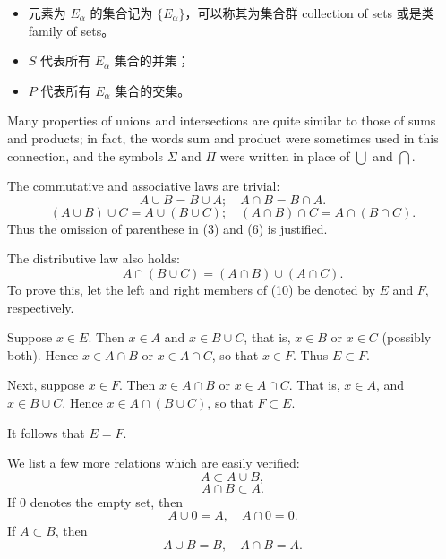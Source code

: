 \documentclass[../poma-notes.tex]{subfiles}
\begin{document}
\begin{anote}
  \begin{itemize}
    \item 元素为 $E_{\alpha}$ 的集合记为 $\{E_{\alpha}\}$，可以称其为集合群 collection of sets 或是类 family of sets。
    \item $S$ 代表所有 $E_{\alpha}$ 集合的并集；
    \item $P$ 代表所有 $E_{\alpha}$ 集合的交集。
  \end{itemize}
\end{anote}

\begin{remarks}
  Many properties of unions and intersections are quite similar to those of sums and products; in fact,
  the words sum and product were sometimes used in this connection, and the symbols $\Sigma$ and $\Pi$
  were written in place of $\bigcup$ and $\bigcap$.

  The commutative and associative laws are trivial:
  \begin{equation}
    A \cup B = B \cup A; \quad A \cap B = B \cap A.
  \end{equation}
  \begin{equation}
    (A \cup B) \cup C = A \cup (B \cup C); \quad (A \cap B) \cap C = A \cap (B \cap C).
  \end{equation}
  Thus the omission of parenthese in (3) and (6) is justified.

  The distributive law also holds:
  \begin{equation}
    A \cap (B \cup C) = (A \cap B) \cup (A \cap C).
  \end{equation}
  To prove this, let the left and right members of (10) be denoted by $E$ and $F$, respectively.

  Suppose $x \in E$. Then $x \in A$ and $x \in B \cup C$, that is, $x \in B$ or $x \in C$ (possibly both).
  Hence $x \in A \cap B$ or $x \in A \cap C$, so that $x \in F$. Thus $E \subset F$.

  Next, suppose $x \in F$. Then $x \in A \cap B$ or $x \in A \cap C$. That is, $x \in A$, and
  $x \in B \cup C$. Hence $x \in A \cap (B \cup C)$, so that $F \subset E$.

  It follows that $E = F$.

  We list a few more relations which are easily verified:
  \begin{equation}
    A \subset A \cup B,
  \end{equation}
  \begin{equation}
    A \cap B \subset A.
  \end{equation}
  If 0 denotes the empty set, then
  \begin{equation}
    A \cup 0 = A, \quad A \cap 0 = 0.
  \end{equation}
  If $A \subset B$, then
  \begin{equation}
    A \cup B = B, \quad A \cap B = A.
  \end{equation}
\end{remarks}
\end{document}
